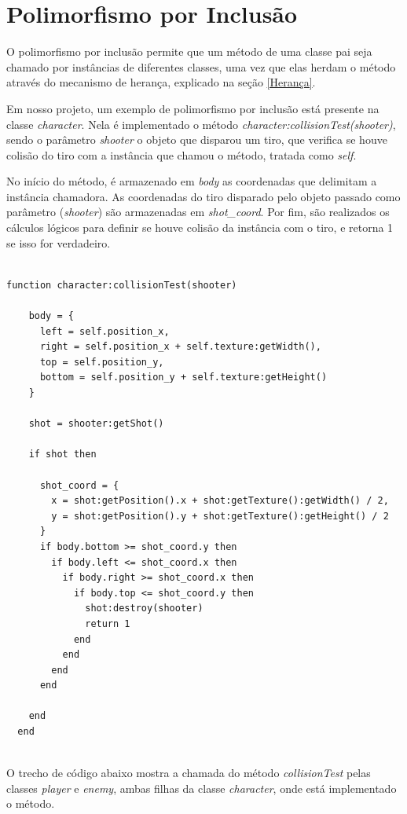 \documentclass[rel_mlp]{iiufrgs}
\begin{document}
\section{Polimorfismo por Inclusão}

O polimorfismo por inclusão permite que um método de uma classe pai seja chamado por instâncias de diferentes classes, uma vez que elas herdam o método através do mecanismo de herança, explicado na seção \ref{Herança}. 

Em nosso projeto, um exemplo de polimorfismo por inclusão está presente na classe \textit{character}. Nela é implementado o método \textit{character:collisionTest(shooter)}, sendo o parâmetro \textit{shooter} o objeto que disparou um tiro, que verifica se houve colisão do tiro com a instância que chamou o método, tratada como \textit{self}.

No início do método, é armazenado em \textit{body} as coordenadas que delimitam a instância chamadora. As coordenadas do tiro disparado pelo objeto passado como parâmetro (\textit{shooter}) são armazenadas em \textit{shot\_coord}. Por fim, são realizados os cálculos lógicos para definir se houve colisão da instância com o tiro, e retorna 1 se isso for verdadeiro.

\begin{lstlisting}

function character:collisionTest(shooter)

    body = {
      left = self.position_x,
      right = self.position_x + self.texture:getWidth(),
      top = self.position_y,
      bottom = self.position_y + self.texture:getHeight()
    }

    shot = shooter:getShot()

    if shot then

      shot_coord = {
        x = shot:getPosition().x + shot:getTexture():getWidth() / 2,
        y = shot:getPosition().y + shot:getTexture():getHeight() / 2
      }
      if body.bottom >= shot_coord.y then
        if body.left <= shot_coord.x then
          if body.right >= shot_coord.x then
            if body.top <= shot_coord.y then
              shot:destroy(shooter)
              return 1
            end
          end
        end
      end

    end
  end
  
\end{lstlisting}

\clearpage

O trecho de código abaixo mostra a chamada do método \textit{collisionTest} pelas classes \textit{player} e \textit{enemy}, ambas filhas da classe \textit{character}, onde está implementado o método.
\end{document}
